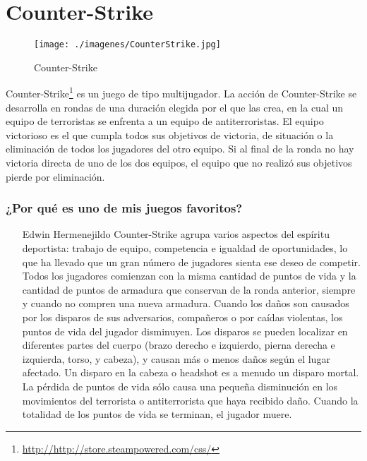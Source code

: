 \section{Counter-Strike}

\begin{figure}[htbp]
\begin{center}
\texttt{[image: ./imagenes/CounterStrike.jpg]}
\caption{Counter-Strike}
\label{Counter-Strike}
\end{center}
\end{figure}
Counter-Strike\footnote{\url{http://http://store.steampowered.com/css/}} es un juego de tipo multijugador. La acción de Counter-Strike se desarrolla en rondas de una duración elegida por el que las crea, en la cual un equipo de terroristas se enfrenta a un equipo de antiterroristas. El equipo victorioso es el que cumpla todos sus objetivos de victoria, de situación o la eliminación de todos los jugadores del otro equipo. Si al final de la ronda no hay victoria directa de uno de los dos equipos, el equipo que no realizó sus objetivos pierde por eliminación.

\subsubsection{¿Por qué es uno de mis juegos favoritos?}
\begin{itemize}
\item[Edwin Hermenejildo] Counter-Strike agrupa varios aspectos del espíritu deportista: trabajo de equipo, competencia e igualdad de oportunidades, lo que ha llevado que un gran número de jugadores sienta ese deseo de competir.
Todos los jugadores comienzan con la misma cantidad de puntos de vida y la cantidad de puntos de armadura que conservan de la ronda anterior, siempre y cuando no compren una nueva armadura. Cuando los daños son causados por los disparos de sus adversarios, compañeros o  por caídas violentas, los puntos de vida del jugador disminuyen. Los disparos se pueden localizar en diferentes partes del cuerpo (brazo derecho e izquierdo, pierna derecha e izquierda, torso, y cabeza), y causan más o menos daños según el lugar afectado. Un disparo en la cabeza o headshot es a menudo un disparo mortal. La pérdida de puntos de vida sólo causa una pequeña disminución en los movimientos del terrorista o antiterrorista que haya recibido daño. Cuando la totalidad de los puntos de vida se terminan, el jugador muere.
\end{itemize}
